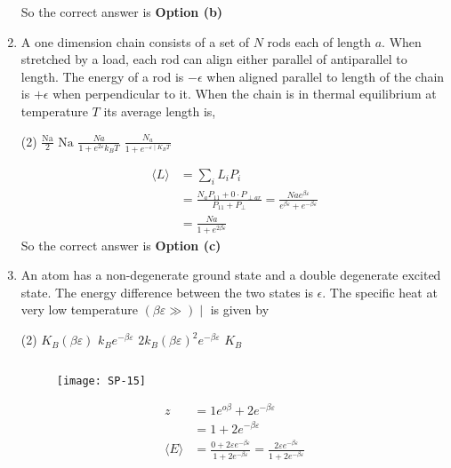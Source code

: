 \begin{enumerate}
\begin{answer}
		So the correct answer is \textbf{Option (b)}
	\end{answer}
	\item A one dimension chain consists of a set of $N$ rods each of length $a$. When stretched by a load, each rod can align either parallel of antiparallel to length. The energy of a rod is $-\epsilon$ when aligned parallel to length of the chain is $+\epsilon$ when perpendicular to it. When the chain is in thermal equilibrium at temperature $T$ its average length is,
	\begin{tasks}(2)
		\task[\textbf{a.}]$\frac{\mathrm{Na}}{2}$
		\task[\textbf{b.}]$\mathrm{Na}$
		\task[\textbf{c.}]$\frac{N a}{1+e^{2 \varepsilon} k_{B} T}$
		\task[\textbf{d.}] $\frac{N_{a}}{1+e^{-\varepsilon \mid K_{B} T}}$
	\end{tasks}
	\begin{answer}
		\begin{align*}
		\langle L\rangle&=\sum_{i} L_{i} P_{i}\\
		&=\frac{N_{a} P_{11}+0 \cdot P_{\perp a r}}{P_{11}+P_{\perp}}=\frac{N a e^{\beta \varepsilon}}{e^{\beta \varepsilon}+e^{-\beta \varepsilon}}\\
		&=\frac{N a}{1+e^{2 \beta \varepsilon}}
		\end{align*}
		So the correct answer is \textbf{Option (c)}
	\end{answer}
	\item An atom has a non-degenerate ground state and a double degenerate excited state. The energy difference between the two states is $\epsilon$. The specific heat at very low temperature $(\beta \varepsilon \gg) \mid$ is given by
	\begin{tasks}(2)
		\task[\textbf{a.}]$K_{B}(\beta \varepsilon)$
		\task[\textbf{b.}]$k_{B} e^{-\beta \varepsilon}$
		\task[\textbf{c.}]$2 k_{B}(\beta \varepsilon)^{2} e^{-\beta \varepsilon}$
		\task[\textbf{d.}] $K_{B}$
	\end{tasks}
	\begin{answer}$\left. \right. $\\
		\begin{figure}[H]
			\centering
			\texttt{[image: SP-15]}
		\end{figure}
		\begin{align*}
		z &=1 e^{o \beta}+2 e^{-\beta \varepsilon} \\
		&=1+2 e^{-\beta \varepsilon}\\
		\langle E\rangle&=\frac{0+2 \varepsilon e^{-\beta \varepsilon}}{1+2 e^{-\beta \varepsilon}}=\frac{2 \varepsilon e^{-\beta \varepsilon}}{1+2 e^{-\beta \varepsilon}}\\

\end{align*}
\end{answer}
\end{enumerate}
